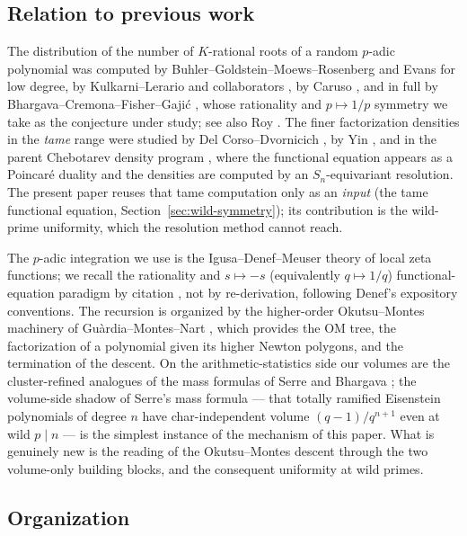 \documentclass[pdflatex,sn-mathphys-num]{sn-jnl}%
\theoremstyle{plain}
\theoremstyle{definition}
\theoremstyle{remark}
\numberwithin{equation}{section}
\begin{document}
\subsection{Relation to previous work}\label{sec:prior}

The distribution of the number of $K$-rational roots of a random $p$-adic
polynomial was computed by Buhler--Goldstein--Moews--Rosenberg
\cite{buhler2006probability} and Evans \cite{evans2006expected} for low degree,
by Kulkarni--Lerario and collaborators \cite{kulkarni2021p}, by Caruso
\cite{caruso2022zeroes}, and in full by Bhargava--Cremona--Fisher--Gaji\'c
\cite{bhargava2022density}, whose rationality and $p\mapsto 1/p$ symmetry we take
as the conjecture under study; see also Roy \cite{roy}. The finer factorization
densities in the \emph{tame} range were studied by Del Corso--Dvornicich
\cite{del_corso_dvornicich_2000}, by Yin \cite{john}, and in the parent
Chebotarev density program \cite{caruso2022zeroes}, where the functional equation
appears as a Poincar\'e duality and the densities are computed by an
$S_{n}$-equivariant resolution. The present paper reuses that tame computation
only as an \emph{input} (the tame functional equation, Section~\ref{sec:wild-symmetry});
its contribution is the wild-prime uniformity, which the resolution method cannot
reach.

The $p$-adic integration we use is the Igusa--Denef--Meuser theory of local zeta
functions; we recall the rationality and $s\mapsto -s$ (equivalently
$q\mapsto 1/q$) functional-equation paradigm by citation
\cite{denef1991functional,igusa2000introduction}, not by re-derivation, following
Denef's expository conventions. The recursion is organized by the higher-order
Okutsu--Montes machinery of Gu\`ardia--Montes--Nart \cite{gmn2012}, which provides
the OM tree, the factorization of a polynomial given its higher Newton polygons,
and the termination of the descent. On the arithmetic-statistics side our volumes
are the cluster-refined analogues of the mass formulas of Serre
\cite{serre1978formule} and Bhargava \cite{bhargava2007mass,bhargava2008higher};
the volume-side shadow of Serre's mass formula --- that totally ramified
Eisenstein polynomials of degree $n$ have char-independent volume
$(q-1)/q^{n+1}$ even at wild $p\mid n$ --- is the simplest instance of the
mechanism of this paper. What is genuinely new is the reading of the
Okutsu--Montes descent through the two volume-only building blocks, and the
consequent uniformity at wild primes.

\subsection{Organization}\label{sec:org}
\end{document}
